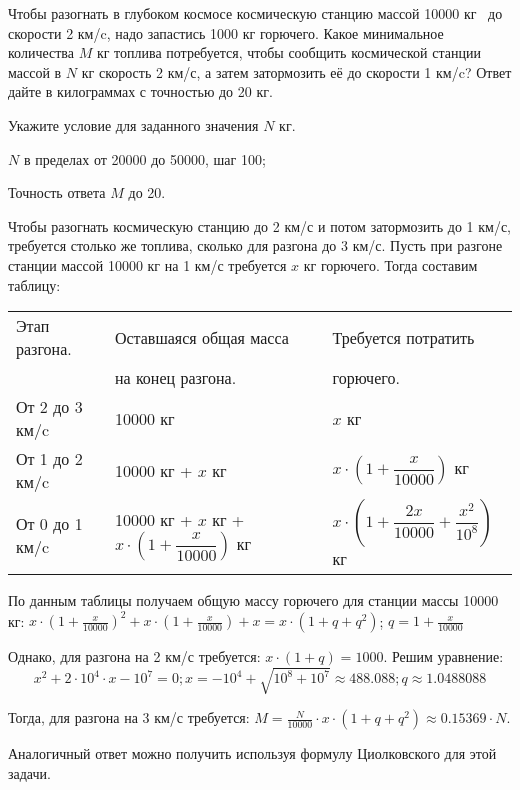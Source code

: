 
Чтобы разогнать в глубоком космосе
космическую станцию массой 10000 кг  до скорости
2 км/c, надо запастись 1000 кг горючего. Какое минимальное количества \linebreak $M$ кг топлива потребуется,
чтобы сообщить космической станции массой в $N$ кг скорость 2 км/с, 
а затем затормозить её до скорости 1 км/c? Ответ дайте в килограммах с точностью до 20 кг.

Укажите условие для заданного значения $N$ кг.

\paramSection

$N$ в пределах от 20000 до 50000, шаг 100;         

Точность ответа $M$  до  20.
\solutionSection

Чтобы разогнать космическую станцию до 2 км/с и потом затормозить до 1 км/с, требуется столько же топлива, 
сколько для разгона до 3 км/с. Пусть при разгоне станции массой 10000 кг  на 1 км/с требуется $x$ кг горючего. 
Тогда составим таблицу:
\begin{tabular}{|l | l | l|}
    \hline
    Этап разгона. &	Оставшаяся общая масса  &	Требуется потратить \\
    & на конец разгона. & горючего.\\
    \hline
    От 2 до 3 км/c & 	10000 кг  &  	$x$ кг\\
    \hline
    От  1 до 2 км/c & 	10000 кг  + $x$ кг	 & $x \cdot \left( 1 + \dfrac{x}{10000}\right)$  кг\\
    \hline
    От 0 до 1 км/c & 	10000 кг  + $x$ кг + $x \cdot \left( 1 + \dfrac{x}{10000}\right)$  кг	 & $x \cdot \left( 1 + \dfrac{2x}{10000} + \dfrac{x^2}{10^8}\right)$   кг\\
    \hline
\end{tabular}

По данным таблицы получаем общую массу горючего для станции \linebreak массы 10000 кг:
$x \cdot \left( 1 + \frac{x}{10000}\right)^2+x \cdot \left( 1 +\frac{x}{10000}\right)+x=x  \cdot (1+q+q^2 )$;  
$q=1 +\frac{x}{10000}$ 

Однако, для разгона на 2 км/с требуется: $x  \cdot (1+q)=1000 $. Решим уравнение:
$$x^2+2 \cdot 10^4 \cdot x-10^7=0; x= -10^4+\sqrt{10^8+10^7}  \approx 488.088; q\approx 1.0488088 $$

Тогда, для разгона на 3 км/с требуется: $M=\frac{N}{10000} \cdot x \cdot (1+q+q^2 )\approx 0.15369 \cdot N.$

Аналогичный ответ можно получить используя формулу Циолковского для этой задачи.

